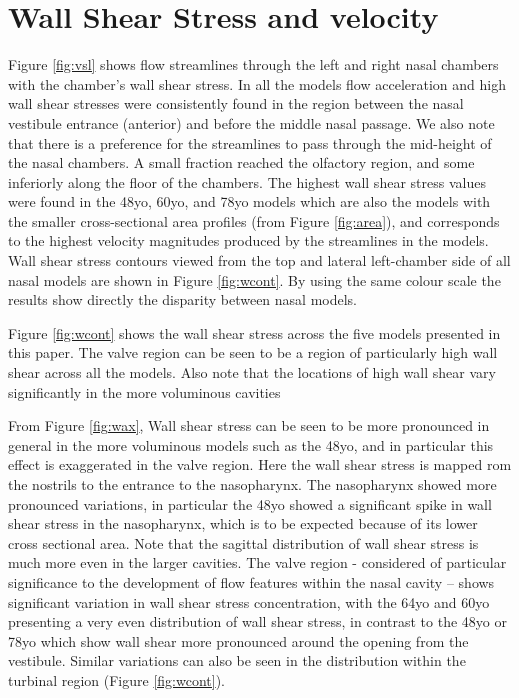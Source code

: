 \section{Wall Shear Stress and velocity}
Figure \ref{fig:vsl} shows flow streamlines through the left and right nasal chambers with the chamber’s wall shear stress. In all the models flow acceleration and high wall shear stresses were consistently found in the region between the nasal vestibule entrance (anterior) and before the middle nasal passage. We also note that there is a preference for the streamlines to pass through the mid-height of the nasal chambers. A small fraction reached the olfactory region, and some inferiorly along the floor of the chambers. The highest wall shear stress values were found in the 48yo, 60yo, and 78yo models which are also the models with the smaller cross-sectional area profiles (from Figure \ref{fig:area}), and corresponds to the highest velocity magnitudes produced by the streamlines in the models. Wall shear stress contours viewed from the top and lateral left-chamber side of all nasal models are shown in Figure \ref{fig:wcont}. By using the same colour scale the results show directly the disparity between nasal models.

Figure \ref{fig:wcont} shows the wall shear stress across the five models presented in this paper. The valve region can be seen to be a region of particularly high wall shear across all the models. Also note that the locations of high wall shear vary significantly in the more voluminous cavities


From Figure \ref{fig:wax}, Wall shear stress can be seen to be more pronounced in general in the more voluminous models such as the 48yo, and in particular this effect is exaggerated in the valve region. Here the wall shear stress is mapped rom the nostrils to the entrance to the nasopharynx. The nasopharynx showed more pronounced variations, in particular the 48yo showed a significant spike in wall shear stress in the nasopharynx, which is to be expected because of its lower cross sectional area. Note that the sagittal distribution of wall shear stress is much more even in the larger cavities.  The valve region - considered of particular significance to the development of flow features within the nasal cavity \cite{Lindemann2008} – shows significant variation in wall shear stress concentration, with the 64yo and 60yo presenting a very even distribution of wall shear stress, in contrast to the 48yo or 78yo which show wall shear more pronounced around the opening from the vestibule. Similar variations can also be seen in the distribution within the turbinal region (Figure \ref{fig:wcont}). 

